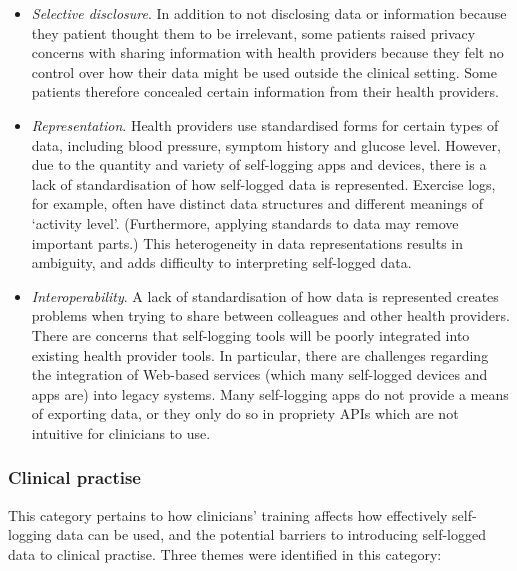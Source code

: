 \documentclass{sigchi}
\begin{document}
\begin{itemize}
    \item \textit{Selective disclosure}. In addition to not disclosing data or information because they patient thought them to be irrelevant, some patients raised privacy concerns with sharing information with health providers because they felt no control over how their data might be used outside the clinical setting. Some patients therefore concealed certain information from their health providers.
    
    \item \textit{Representation}. Health providers use standardised forms for certain types of data, including blood pressure, symptom history and glucose level. However, due to the quantity and variety of self-logging apps and devices, there is a lack of standardisation of how self-logged data is represented.  Exercise logs, for example, often have distinct data structures and different meanings of `activity level'. (Furthermore, applying standards to data may remove important parts.)  This heterogeneity in data representations results in ambiguity, and adds difficulty to interpreting self-logged data.
    
    \item \textit{Interoperability}. A lack of standardisation of how data is represented creates problems when trying to share between colleagues and other health providers. There are concerns that self-logging tools will be poorly integrated into existing health provider tools. In particular, there are challenges regarding the integration of Web-based services (which many self-logged devices and apps are) into legacy systems. Many self-logging apps do not provide a means of exporting data, or they only do so in propriety APIs which are not intuitive for clinicians to use.
\end{itemize}

\subsubsection{Clinical practise}

This category pertains to how clinicians' training affects how effectively self-logging data can be used, and the potential barriers to introducing self-logged data to clinical practise. Three themes were identified in this category:
\end{document}
